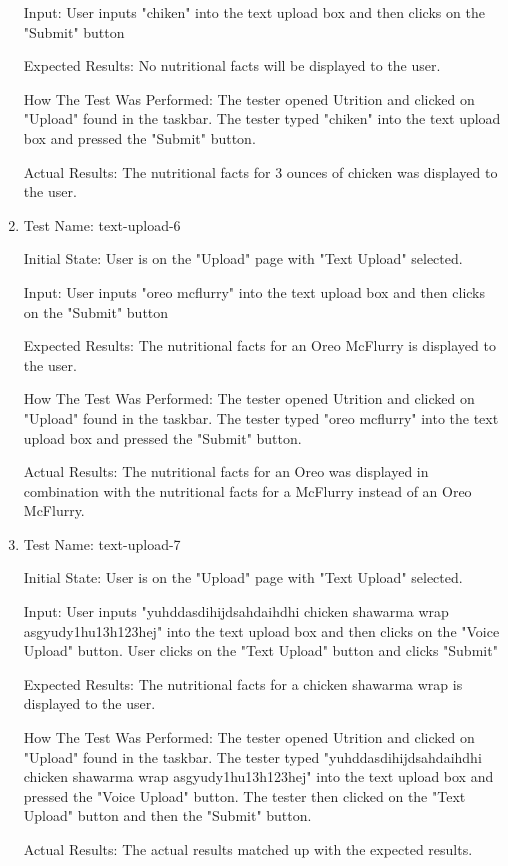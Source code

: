 \documentclass[12pt, titlepage]{article}
\begin{document}
\begin{enumerate}
		Input: User inputs "chiken" into the text upload box and then clicks on the "Submit" button
		
		Expected Results: No nutritional facts will be displayed to the user.
		
		How The Test Was Performed: The tester opened Utrition and clicked on "Upload" found in the taskbar. The tester typed "chiken" into the text upload box and pressed the "Submit" button.
		
		Actual Results: The nutritional facts for 3 ounces of chicken was displayed to the user.
		
		\item{Test Name: text-upload-6}
		
		Initial State: User is on the "Upload" page with "Text Upload" selected.
		
		Input: User inputs "oreo mcflurry" into the text upload box and then clicks on the "Submit" button
		
		Expected Results: The nutritional facts for an Oreo McFlurry is displayed to the user.
		
		How The Test Was Performed: The tester opened Utrition and clicked on "Upload" found in the taskbar. The tester typed "oreo mcflurry" into the text upload box and pressed the "Submit" button.
		
		Actual Results: The nutritional facts for an Oreo was displayed in combination with the nutritional facts for a McFlurry instead of an Oreo McFlurry.
		
		\item{Test Name: text-upload-7}
		
		Initial State: User is on the "Upload" page with "Text Upload" selected.
		
		Input: User inputs "yuhddasdihijdsahdaihdhi chicken shawarma wrap asgyudy1hu13h123hej" into the text upload box and then clicks on the "Voice Upload" button. User clicks on the "Text Upload" button and clicks "Submit"
		
		Expected Results: The nutritional facts for a chicken shawarma wrap is displayed to the user.
		
		How The Test Was Performed: The tester opened Utrition and clicked on "Upload" found in the taskbar. The tester typed "yuhddasdihijdsahdaihdhi chicken shawarma wrap asgyudy1hu13h123hej" into the text upload box and pressed the "Voice Upload" button. The tester then clicked on the "Text Upload" button and then the "Submit" button.
		
		Actual Results: The actual results matched up with the expected results.
		

\end{enumerate}
\end{document}
